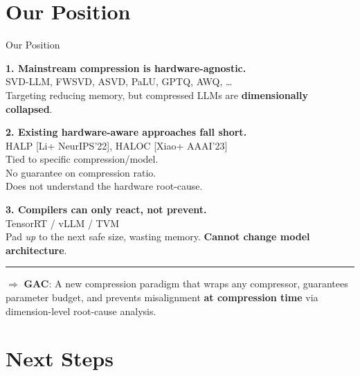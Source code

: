 \documentclass[aspectratio=169,10pt]{beamer}
\begin{document}
\section{Our Position}

\begin{frame}{Our Position}

\textbf{1. Mainstream compression is hardware-agnostic.}\\[0.05cm]
{\footnotesize SVD-LLM, FWSVD, ASVD, PaLU, GPTQ, AWQ, \ldots}\\[0.05cm]
Targeting reducing memory, but compressed LLMs are \textbf{dimensionally collapsed}.

\vspace{0.2cm}
\textbf{2. Existing hardware-aware approaches fall short.}\\[0.05cm]
{\footnotesize HALP [Li+ NeurIPS'22], HALOC [Xiao+ AAAI'23]}\\[0.05cm]
Tied to specific compression/model.\\
No guarantee on compression ratio.\\
Does not understand the hardware root-cause.

\vspace{0.2cm}
\textbf{3. Compilers can only react, not prevent.}\\[0.05cm]
{\footnotesize TensorRT / vLLM / TVM}\\[0.05cm]
Pad \emph{up} to the next safe size, wasting memory. \textbf{Cannot change model architecture}.

\vspace{0.2cm}
\hrule
\vspace{0.15cm}
{\small $\Rightarrow$ \textbf{GAC}: A new compression paradigm that wraps any compressor, guarantees parameter budget, and prevents misalignment \textbf{at compression time} via dimension-level root-cause analysis.}
\end{frame}


\section{Next Steps}
\end{document}
